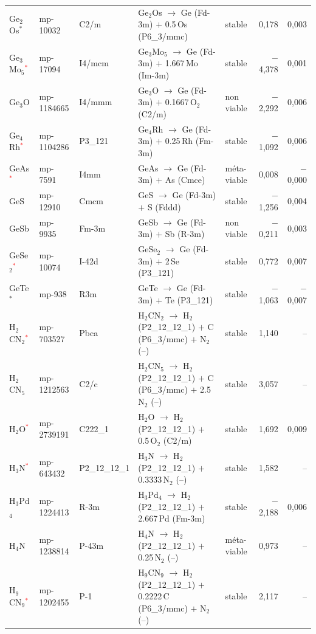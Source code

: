 \begin{longtable}{@{}ll l@{\hspace{4pt}} p{4.6cm} l@{\hspace{4pt}} rr@{}}
Ge$_{2}$Os$^*$ & mp-10032 & C2/m & Ge$_{2}$Os $\to$ Ge (Fd-3m) $+$ 0.5\,Os (P6\_3/mmc) & stable & 0{,}178 & 0{,}003 \\
Ge$_{3}$Mo$_{5}$\textcolor{red}{$^*$} & mp-17094 & I4/mcm & Ge$_{3}$Mo$_{5}$ $\to$ Ge (Fd-3m) $+$ 1.667\,Mo (Im-3m) & stable & $-$4{,}378 & 0{,}001 \\
Ge$_{3}$O & mp-1184665 & I4/mmm & Ge$_{3}$O $\to$ Ge (Fd-3m) $+$ 0.1667\,O$_{2}$ (C2/m) & non viable & $-$2{,}292 & 0{,}006 \\
Ge$_{4}$Rh\textcolor{red}{$^*$} & mp-1104286 & P3\_121 & Ge$_{4}$Rh $\to$ Ge (Fd-3m) $+$ 0.25\,Rh (Fm-3m) & stable & $-$1{,}092 & 0{,}006 \\
GeAs\textcolor{red}{$^*$} & mp-7591 & I4mm & GeAs $\to$ Ge (Fd-3m) $+$ As (Cmce) & m\'eta-viable & 0{,}008 & $-$0{,}000 \\
GeS & mp-12910 & Cmcm & GeS $\to$ Ge (Fd-3m) $+$ S (Fddd) & stable & $-$1{,}256 & 0{,}004 \\
GeSb & mp-9935 & Fm-3m & GeSb $\to$ Ge (Fd-3m) $+$ Sb (R-3m) & non viable & $-$0{,}211 & 0{,}003 \\
GeSe$_{2}$\textcolor{red}{$^*$} & mp-10074 & I-42d & GeSe$_{2}$ $\to$ Ge (Fd-3m) $+$ 2\,Se (P3\_121) & stable & 0{,}772 & 0{,}007 \\
GeTe$^*$ & mp-938 & R3m & GeTe $\to$ Ge (Fd-3m) $+$ Te (P3\_121) & stable & $-$1{,}063 & $-$0{,}007 \\
H$_{2}$CN$_{2}$\textcolor{red}{$^*$} & mp-703527 & Pbca & H$_{2}$CN$_{2}$ $\to$ H$_{2}$ (P2\_12\_12\_1) $+$ C (P6\_3/mmc) $+$ N$_{2}$ (--) & stable & 1{,}140 & -- \\
H$_{2}$CN$_{5}$ & mp-1212563 & C2/c & H$_{2}$CN$_{5}$ $\to$ H$_{2}$ (P2\_12\_12\_1) $+$ C (P6\_3/mmc) $+$ 2.5\,N$_{2}$ (--) & stable & 3{,}057 & -- \\
H$_{2}$O\textcolor{red}{$^*$} & mp-2739191 & C222\_1 & H$_{2}$O $\to$ H$_{2}$ (P2\_12\_12\_1) $+$ 0.5\,O$_{2}$ (C2/m) & stable & 1{,}692 & 0{,}009 \\
H$_{3}$N\textcolor{red}{$^*$} & mp-643432 & P2\_12\_12\_1 & H$_{3}$N $\to$ H$_{2}$ (P2\_12\_12\_1) $+$ 0.3333\,N$_{2}$ (--) & stable & 1{,}582 & -- \\
H$_{3}$Pd$_{4}$ & mp-1224413 & R-3m & H$_{3}$Pd$_{4}$ $\to$ H$_{2}$ (P2\_12\_12\_1) $+$ 2.667\,Pd (Fm-3m) & stable & $-$2{,}188 & 0{,}006 \\
H$_{4}$N & mp-1238814 & P-43m & H$_{4}$N $\to$ H$_{2}$ (P2\_12\_12\_1) $+$ 0.25\,N$_{2}$ (--) & m\'eta-viable & 0{,}973 & -- \\
H$_{9}$CN$_{9}$\textcolor{red}{$^*$} & mp-1202455 & P-1 & H$_{9}$CN$_{9}$ $\to$ H$_{2}$ (P2\_12\_12\_1) $+$ 0.2222\,C (P6\_3/mmc) $+$ N$_{2}$ (--) & stable & 2{,}117 & -- \\

\end{longtable}
